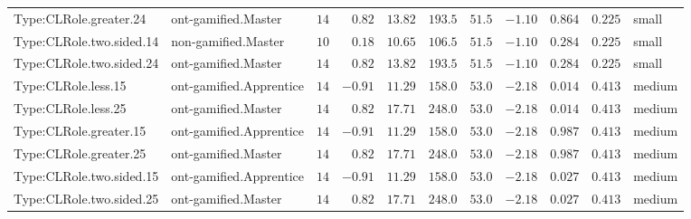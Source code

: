 \documentclass[6pt,a4paper]{article}
\begin{document}
{\begin{longtable}{llrrrrrrrrl}
Type:CLRole.greater.24&ont-gamified.Master&$14$&$ 0.82$&$13.82$&$193.5$&$ 51.5$&$-1.10$&$0.864$&$0.225$&small\tabularnewline
Type:CLRole.two.sided.14&non-gamified.Master&$10$&$ 0.18$&$10.65$&$106.5$&$ 51.5$&$-1.10$&$0.284$&$0.225$&small\tabularnewline
Type:CLRole.two.sided.24&ont-gamified.Master&$14$&$ 0.82$&$13.82$&$193.5$&$ 51.5$&$-1.10$&$0.284$&$0.225$&small\tabularnewline
Type:CLRole.less.15&ont-gamified.Apprentice&$14$&$-0.91$&$11.29$&$158.0$&$ 53.0$&$-2.18$&$0.014$&$0.413$&medium\tabularnewline
Type:CLRole.less.25&ont-gamified.Master&$14$&$ 0.82$&$17.71$&$248.0$&$ 53.0$&$-2.18$&$0.014$&$0.413$&medium\tabularnewline
Type:CLRole.greater.15&ont-gamified.Apprentice&$14$&$-0.91$&$11.29$&$158.0$&$ 53.0$&$-2.18$&$0.987$&$0.413$&medium\tabularnewline
Type:CLRole.greater.25&ont-gamified.Master&$14$&$ 0.82$&$17.71$&$248.0$&$ 53.0$&$-2.18$&$0.987$&$0.413$&medium\tabularnewline
\newpage
Type:CLRole.two.sided.15&ont-gamified.Apprentice&$14$&$-0.91$&$11.29$&$158.0$&$ 53.0$&$-2.18$&$0.027$&$0.413$&medium\tabularnewline
Type:CLRole.two.sided.25&ont-gamified.Master&$14$&$ 0.82$&$17.71$&$248.0$&$ 53.0$&$-2.18$&$0.027$&$0.413$&medium\tabularnewline
\hline
\end{longtable}}
\end{document}
